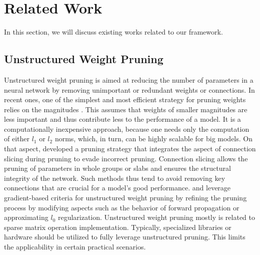 \section{Related Work}
In this section, we will discuss existing works related to our framework.


\subsection{Unstructured Weight Pruning} 
Unstructured weight pruning is aimed at reducing the number of parameters in a neural network by removing unimportant or redundant weights or connections. In recent ones, one of the simplest and most efficient strategy for pruning weights relies on the magnitudes \cite{han2015learning, Zhu2017ToPO, Kusupati2020SoftTW, Guo9533741, Guo9533833}. This assumes that weights of smaller magnitudes are less important and thus contribute less to the performance of a model. It is a computationally inexpensive approach, because one needs only the computation of either $l_1$ or $l_2$ norms, which, in turn, can be highly scalable for big models. On that aspect, \cite{guo2016dynamic} developed a pruning strategy that integrates the aspect of connection slicing during pruning to evade incorrect pruning. Connection slicing allows the pruning of parameters in whole groups or slabs and ensures the structural integrity of the network. Such methods thus tend to avoid removing key connections that are crucial for a model's good performance. \cite{Lin2020DynamicMP} and \cite{Savarese2019WinningTL} leverage gradient-based criteria for unstructured weight pruning by refining the pruning process by modifying aspects such as the behavior of forward propagation or approximating $l_0$ regularization. Unstructured weight pruning mostly is related to sparse matrix operation implementation. Typically, specialized libraries or hardware should be utilized to fully leverage unstructured pruning. This limits the applicability in certain practical scenarios.

